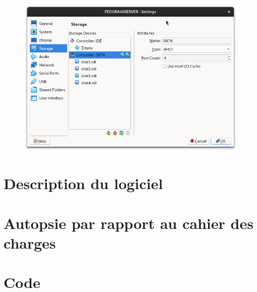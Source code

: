 \documentclass{article}
\begin{document}
\begin{figure}[h!]
		\centering
		\includegraphics[width=1\textwidth]{vbox22.png}
\end{figure}


\pagebreak

\section{Description du logiciel}

\pagebreak

\section{Autopsie par rapport au cahier des charges}

\pagebreak

\section{Code}
%	
	
\end{document}
